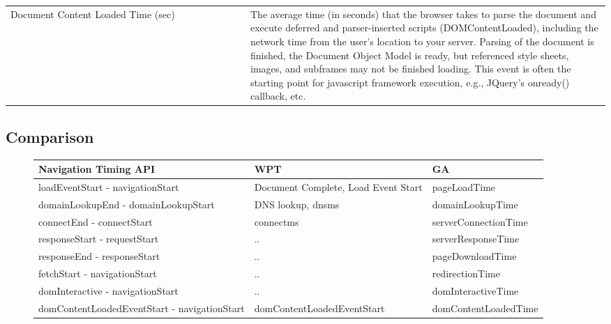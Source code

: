 \begin{center}
\begin{tabular}{ p{0.4\linewidth} | p{0.6\linewidth} }
	Document Content Loaded Time (sec) & The average time (in seconds) that the browser takes to parse the document and execute deferred and parser-inserted scripts (DOMContentLoaded), including the network time from the user's location to your server. Parsing of the document is finished, the Document Object Model is ready, but referenced style sheets, images, and subframes may not be finished loading. This event is often the starting point for javascript framework execution, e.g., JQuery's onready() callback, etc.  \\
	\end{tabular}
\end{center}





\subsection{Comparison}


\begin{sidewaysfigure}

\begin{center}
	\begin{tabular}{ l | l | l }
	Navigation Timing API & WPT & GA \\ 
	\hline
	loadEventStart - navigationStart & Document Complete, Load Event Start & pageLoadTime \\
	domainLookupEnd - domainLookupStart & DNS lookup, dns\textunderscore ms & domainLookupTime \\
	connectEnd - connectStart & connect\textunderscore ms & serverConnectionTime \\
	responseStart - requestStart & .. & serverResponseTime \\
	responseEnd - responseStart & .. & pageDownloadTime \\
	fetchStart - navigationStart & .. & redirectionTime \\
	domInteractive - navigationStart & .. & domInteractiveTime \\
	domContentLoadedEventStart - navigationStart & domContentLoadedEventStart & domContentLoadedTime \\
	\end{tabular}
\end{center}


\end{sidewaysfigure}




